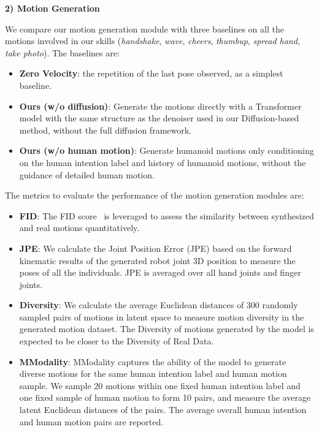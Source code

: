 
\noindent\textbf{2) Motion Generation}

We compare our motion generation module with three baselines on all the motions involved in our skills (\textit{handshake}, \textit{wave}, \textit{cheers}, \textit{thumbup}, \textit{spread hand}, \textit{take photo}). The baselines are:
\begin{itemize}[leftmargin=*]
    \item \textbf{Zero Velocity}: the repetition of the last pose observed, as a simplest baseline.
    \item \textbf{Ours (w/o diffusion)}: Generate the motions directly with a Transformer model with the same structure as the denoiser used in our Diffusion-based method, without the full diffusion framework.
    \item \textbf{Ours (w/o human motion)}: Generate humanoid motions only conditioning on the human intention label and history of humanoid motions, without the guidance of detailed human motion.
\end{itemize}

The metrics to evaluate the performance of the motion generation modules are:
\begin{itemize}[leftmargin=*]
    \item \textbf{FID}: 
    The FID score~\cite{heusel2017gans} is leveraged to assess the similarity between synthesized and real motions quantitatively.
    \item \textbf{JPE}: 
    We calculate the Joint Position Error (JPE) based on the forward kinematic results of the generated robot joint 3D position to measure the poses of all the individuals. JPE is averaged over all hand joints and finger joints.
    \item \textbf{Diversity}: 
    We calculate the average Euclidean distances of $300$ randomly sampled pairs of motions in latent space to measure motion diversity in the generated motion dataset. The Diversity of motions generated by the model is expected to be closer to the Diversity of Real Data.
    \item \textbf{MModality}: 
    MModality captures the ability of the model to generate diverse motions for the same human intention label and human motion sample.
    We sample 20 motions within one fixed human intention label and one fixed sample of human motion to form 10 pairs, and measure the average latent Euclidean distances of the pairs. The average overall human intention and human motion pairs are reported. 
\end{itemize}

